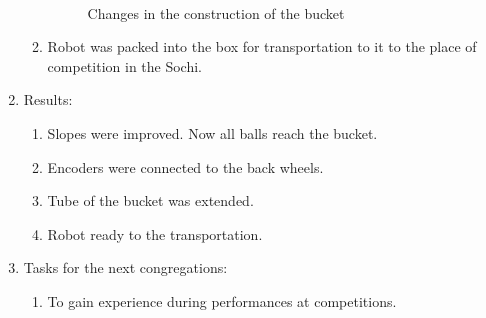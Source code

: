 \begin{enumerate}
\begin{enumerate}
      \begin{figure}[H]
      	\begin{minipage}[h]{0.2\linewidth}
      		\center  
      	\end{minipage}
      	\begin{minipage}[h]{0.6\linewidth}
      		\caption{Changes in the construction of the bucket}
      	\end{minipage}
      \end{figure}
      
      \item Robot was packed into the box for transportation to it to the place of competition in the Sochi.
          
    \end{enumerate}
    
	\item Results: 
	\begin{enumerate}
	  \item Slopes were improved. Now all balls reach the bucket.
	  
      \item Encoders were connected to the back wheels.
      
      \item Tube of the bucket was extended.
      
      \item Robot ready to the transportation.
      
    \end{enumerate}
    
	\item Tasks for the next congregations:
	\begin{enumerate}
	  \item To gain experience during performances at competitions.
	  
    \end{enumerate}     
\end{enumerate}
\fillpage